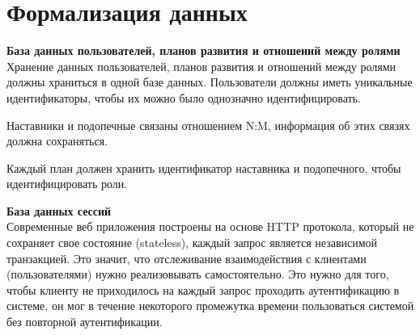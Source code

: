 %
%

%

\section{Формализация данных}

\noindent\textbf{База данных пользователей, планов развития и отношений между ролями}\\

Хранение данных пользователей, планов развития и отношений между ролями должны храниться в одной базе данных.
Пользователи должны иметь уникальные идентификаторы, чтобы их можно было однозначно идентифицировать.

Наставники и подопечные связаны отношением N:M, информация об этих связях должна сохраняться.

Каждый план должен хранить идентификатор наставника и подопечного, чтобы идентифицировать роли.

\noindent\textbf{База данных сессий}\\

Современные веб приложения построены на основе HTTP протокола, который не сохраняет свое состояние (stateless\cite{stateful-stateless}), каждый запрос
является независимой транзакцией.
Это значит, что отслеживание взаимодействия с клиентами (пользователями) нужно реализовывать самостоятельно.
Это нужно для того, чтобы клиенту не приходилось на каждый запрос проходить аутентификацию в системе, он мог в течение некоторого промежутка
времени пользоваться системой без повторной аутентификации.

